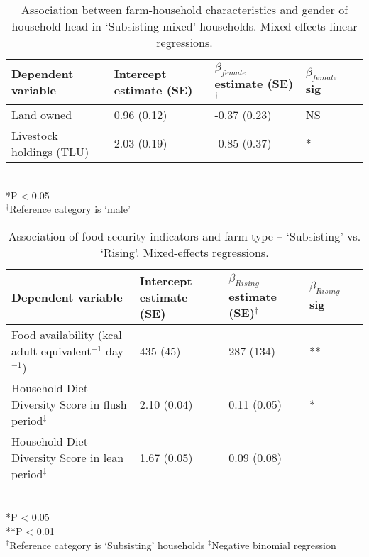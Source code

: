 \begin{table}
  \captionsetup{singlelinecheck = false, justification=justified}
  \caption{
  Association between farm-household characteristics and gender of household head in `Subsisting mixed' households. Mixed-effects linear regressions.
  }
  \label{tab:A_3}
  \small
\begin{tabular}{L{5cm} C{2.5cm} C{2.5cm} C{2cm} C{2cm}}
\toprule
Dependent variable & Intercept estimate (SE) & $\beta_{female}$ estimate (SE)$^\dag$ & $\beta_{female}$ sig \\
\midrule
Land owned & 0.96 (0.12) & -0.37 (0.23) & NS \\
Livestock holdings (TLU) & 2.03 (0.19) & -0.85 (0.37) & * \\
\bottomrule
\end{tabular}
\footnotesize
\raggedright
\\
*P {\textless} 0.05 \\
$^\dag$Reference category is `male'
\end{table}

\begin{table}
  \captionsetup{singlelinecheck = false, justification=justified}
  \caption{
  Association of food security indicators and farm type -- `Subsisting' vs. `Rising'. Mixed-effects regressions.
  }
  \label{tab:A_4}
  \small
\begin{tabular}{L{5cm} C{2.5cm} C{2.5cm} C{2cm} C{2cm}}
\toprule
Dependent variable & Intercept estimate (SE) & $\beta_{Rising}$ estimate (SE)$^\dag$ & $\beta_{Rising}$ sig \\
\midrule
Food availability (kcal adult equivalent$^{-1}$ day$^{-1}$) & 435 (45) & 287 (134) & ** \\
Household Diet Diversity Score in flush period$^\ddag$ & 2.10 (0.04) & 0.11 (0.05) & * \\
Household Diet Diversity Score in lean period$^\ddag$ & 1.67 (0.05) & 0.09 (0.08) &  \\
\bottomrule
\end{tabular}
\footnotesize
\raggedright
\\
*P {\textless} 0.05 \\
**P {\textless} 0.01 \\
$^\dag$Reference category is `Subsisting' households
$^\ddag$Negative binomial regression
\end{table}
